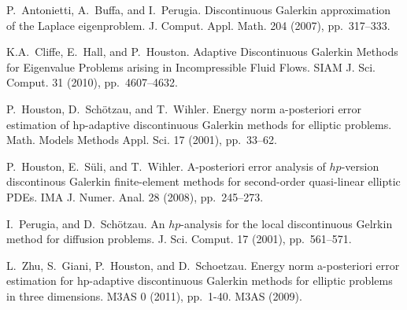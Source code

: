 
\begin{thebibliography}{10}

{\sc P.~Antonietti, A.~Buffa, and I.~Perugia.}
{Discontinuous Galerkin approximation of the Laplace eigenproblem}.
J. Comput. Appl. Math. 204 (2007), pp.~317--333. 

{\sc K.A.~Cliffe, E.~Hall, and P.~Houston.}
{Adaptive Discontinuous {G}alerkin Methods for Eigenvalue Problems arising in Incompressible Fluid Flows}. SIAM J. Sci. Comput. 31 (2010), pp.~4607--4632.

{\sc P.~Houston, D.~Sch\"{o}tzau, and T.~Wihler.}
{Energy norm a-posteriori error estimation of hp-adaptive discontinuous Galerkin methods for elliptic problems}. Math. Models Methods Appl. Sci. 17 (2001), pp.~33--62.

{\sc P.~Houston, E.~S\"{u}li, and T.~Wihler.}
{A-posteriori error analysis of $hp$-version discontinous {G}alerkin finite-element methods for second-order quasi-linear elliptic {PDEs}}.
IMA J. Numer. Anal. 28 (2008), pp.~245--273. 

{\sc I.~Perugia, and D.~Sch\"{o}tzau.}
{An $hp$-analysis for the local discontinuous Gelrkin method for diffusion problems}. J. Sci. Comput. 17 (2001), pp.~561--571.

{\sc L.~Zhu, S.~Giani, P.~Houston, and D.~Schoetzau.}
{Energy norm a-posteriori error estimation for hp-adaptive discontinuous Galerkin methods for elliptic problems in three dimensions}. M3AS 0 (2011), pp.~1-40.
M3AS  (2009). 

\end{thebibliography}